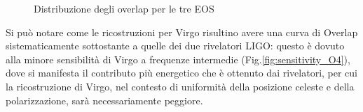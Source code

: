 \begin{figure}[ht]
	\vspace{-10pt}
	\centering
	\vspace{-5pt}
	\caption{Distribuzione degli overlap per le tre EOS}
	\label{fig:Overlap_distribution}
	\vspace{-15pt}
\end{figure}
Si può notare come le ricostruzioni per Virgo risultino avere una curva di Overlap sistematicamente sottostante a quelle dei due rivelatori LIGO: questo è dovuto alla minore sensibilità di Virgo a frequenze intermedie (Fig.\ref{fig:sensitivity_O4}), dove si manifesta il contributo più energetico che è ottenuto dai rivelatori, per cui la ricostruzione di Virgo, nel contesto di uniformità della posizione celeste e della polarizzazione, sarà necessariamente peggiore.
